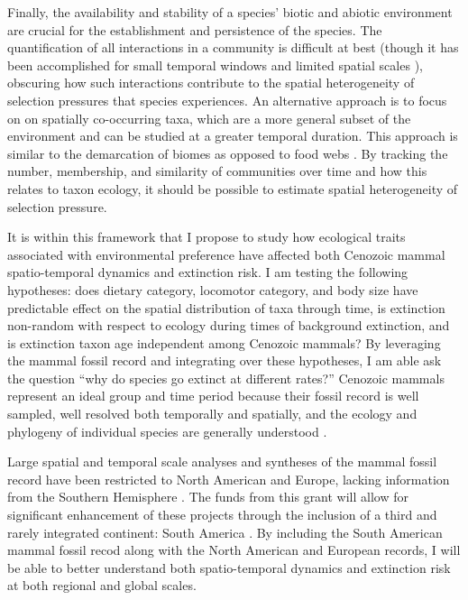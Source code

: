 \documentclass[11pt,letterpaper]{article}
\begin{document}
Finally, the availability and stability of a species' biotic and abiotic environment are crucial for the establishment and persistence of the species. The quantification of all interactions in a community is difficult at best (though it has been accomplished for small temporal windows and limited spatial scales \citep{Angielczyk2005,Mitchell2012,Roopnarine2007}), obscuring how such interactions contribute to the spatial heterogeneity of selection pressures that species experiences. An alternative approach is to focus on on spatially co-occurring taxa, which are a more general subset of the environment and can be studied at a greater temporal duration. This approach is similar to the demarcation of biomes as opposed to food webs \citep{Vilhena2013b}. By tracking the number, membership, and similarity of communities over time and how this relates to taxon ecology, it should be possible to estimate spatial heterogeneity of selection pressure.

It is within this framework that I propose to study how ecological traits associated with environmental preference have affected both Cenozoic mammal spatio-temporal dynamics and extinction risk. I am testing the following hypotheses: does dietary category, locomotor category, and body size have predictable effect on the spatial distribution of taxa through time, is extinction non-random with respect to ecology during times of background extinction, and is extinction taxon age independent among Cenozoic mammals? By leveraging the mammal fossil record and integrating over these hypotheses, I am able ask the question ``why do species go extinct at different rates?'' Cenozoic mammals represent an ideal group and time period because their fossil record is well sampled, well resolved both temporally and spatially, and the ecology and phylogeny of individual species are generally understood \citep{Alroy2009,Alroy2000g,Jernvall2002,Liow2008,Smith2004}. 

Large spatial and temporal scale analyses and syntheses of the mammal fossil record have been restricted to North American and Europe, lacking information from the Southern Hemisphere \citep{Jernvall2004,Jernvall2002,Fortelius2002,Janis2000,Alroy1996a,Alroy1998,Alroy2000g,Liow2008,Raia2006,Tomiya2013}. The funds from this grant will allow for significant enhancement of these projects through the inclusion of a third and rarely integrated continent: South America \citep{Stromberg2013,Marshall1982}. By including the South American mammal fossil recod along with the North American and European records, I will be able to better understand both spatio-temporal dynamics and extinction risk at both regional and global scales. 
\end{document}
